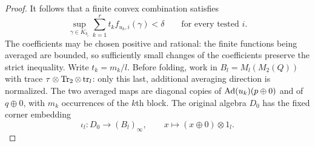\begin{proof}
It follows that a finite convex combination satisfies
\begin{equation}\label{un:uniform-square}
 \sup_{\gamma\in K_{b_i}}
 \sum_{k=1}^r t_k f_{u_k,i}(\gamma)<\delta
 \qquad\text{for every tested }i.
\end{equation}
The coefficients may be chosen positive and rational: the finite
functions being averaged are bounded, so sufficiently small changes
of the coefficients preserve the strict inequality.  Write
$t_k=m_k/l$.  Before folding, work in $B_l=M_l(M_2(Q))$ with trace
$\tau\otimes\operatorname{Tr}_2\otimes\operatorname{tr}_l$: only this last,
additional averaging direction is normalized.  The two averaged maps
are diagonal copies of $\operatorname{Ad}(u_k)(p\oplus0)$ and of $q\oplus0$,
with $m_k$ occurrences of the $k$th block.  The original algebra $D_0$
has the fixed corner embedding
\[
 \iota_l:D_0\longrightarrow(B_l)_\infty,
 \qquad x\longmapsto(x\oplus0)\otimes1_l.
\]


\end{proof}
